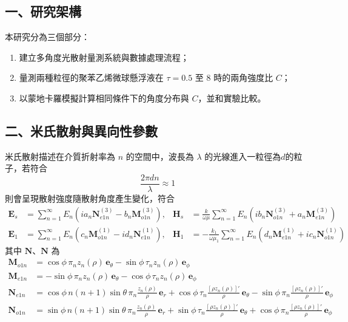 \subsection*{一、研究架構}
本研究分為三個部分：
\begin{enumerate}
\item 建立多角度光散射量測系統與數據處理流程；
\item 量測兩種粒徑的聚苯乙烯微球懸浮液在 $\tau=0.5$ 至 $8$ 時的兩角強度比 $C$；
\item 以蒙地卡羅模擬計算相同條件下的角度分布與 $C$，並和實驗比較。
\end{enumerate}

\subsection*{二、米氏散射與異向性參數}
米氏散射描述在介質折射率為 $n$ 的空間中，波長為 $\lambda$ 的光線進入一粒徑為$d$的粒子，若符合 
\begin{equation}
    \frac{2 \pi d n}{\lambda} \approx 1
\end{equation}
則會呈現散射強度隨散射角度產生變化，符合
\begin{align}
    \mathbf{E}_s &= \sum_{n=1}^{\infty} E_n \left( i a_n \mathbf{N}^{(3)}_{e1n} - b_n \mathbf{M}^{(3)}_{o1n} \right), & \mathbf{H}_s &= \frac{k}{\omega\mu} \sum_{n=1}^{\infty} E_n \left( i b_n \mathbf{N}^{(3)}_{o1n} + a_n \mathbf{M}^{(3)}_{e1n} \right) \\
    \mathbf{E}_1 &= \sum_{n=1}^{\infty} E_n \left( c_n \mathbf{M}^{(1)}_{o1n} - i d_n \mathbf{N}^{(1)}_{e1n} \right), & \mathbf{H}_1 &= -\frac{k_1}{\omega\mu_1} \sum_{n=1}^{\infty} E_n \left( d_n \mathbf{M}^{(1)}_{e1n} + i c_n \mathbf{N}^{(1)}_{o1n} \right)
\end{align}
其中 $\mathbf{N}$、$\mathbf{N}$ 為
\begin{align}
    \mathbf{M}_{o1n} &= \cos\phi\, \pi_n z_n(\rho)\, \mathbf{e}_{\theta} - \sin\phi\, \tau_n z_n(\rho)\, \mathbf{e}_{\phi}\\
    \mathbf{M}_{e1n} &= -\sin\phi\, \pi_n z_n(\rho)\, \mathbf{e}_{\theta} - \cos\phi\, \tau_n z_n(\rho)\, \mathbf{e}_{\phi} \\
    \mathbf{N}_{e1n} &= \cos\phi\, n(n+1)\sin\theta\, \pi_n \frac{z_n(\rho)}{\rho}\, \mathbf{e}_r + \cos\phi\, \tau_n \frac{\left[\rho z_n(\rho)\right]'}{\rho}\, \mathbf{e}_{\theta} - \sin\phi\, \pi_n \frac{\left[\rho z_n(\rho)\right]'}{\rho}\, \mathbf{e}_{\phi} \\
    \mathbf{N}_{o1n} &= \sin\phi\, n(n+1)\sin\theta\, \pi_n \frac{z_n(\rho)}{\rho}\, \mathbf{e}_r + \sin\phi\, \tau_n \frac{\left[\rho z_n(\rho)\right]'}{\rho}\, \mathbf{e}_{\theta} + \cos\phi\, \pi_n \frac{\left[\rho z_n(\rho)\right]'}{\rho}\, \mathbf{e}_{\phi}
\end{align}
